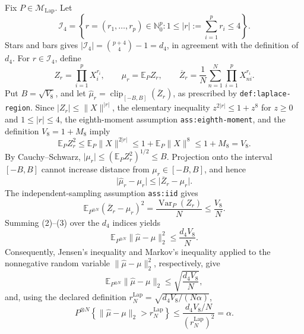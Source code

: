 Fix \(P\in\mathcal M_{\mathrm{Lap}}\).  Let
\[
 \mathcal I_4=\left\{r=(r_1,\ldots,r_p)\in\mathbb N_0^p:
 1\le |r|:=\sum_{i=1}^p r_i\le 4\right\}.
\]
Stars and bars gives
\(\lvert\mathcal I_4\rvert=\binom{p+4}{4}-1=d_4\), in agreement with
the definition of \(d_4\).  For \(r\in\mathcal I_4\), define
\[
 Z_r=\prod_{i=1}^p X_i^{r_i},\qquad
 \mu_r=\mathbb E_P Z_r,\qquad
 \overline Z_r=\frac1N\sum_{n=1}^N\prod_{i=1}^p X_{ni}^{r_i}.
\]
Put \(B=\sqrt{V_8}\), and let
\(\widehat\mu_r=\operatorname{clip}_{[-B,B]}(\overline Z_r)\), as
prescribed by \texttt{def:laplace-region}.  Since
\(\lvert Z_r\rvert\leq\lVert X\rVert^{|r|}\), the elementary inequality
\(z^{2|r|}\leq 1+z^8\) for \(z\geq0\) and \(1\leq |r|\leq4\), the
eighth-moment assumption \texttt{ass:eighth-moment}, and the definition
\(V_8=1+M_8\) imply
\[
 \mathbb E_P Z_r^2
 \leq \mathbb E_P\lVert X\rVert^{2|r|}
 \leq 1+\mathbb E_P\lVert X\rVert^8
 \leq 1+M_8=V_8.                                      \tag{1}
\]
By Cauchy--Schwarz, \(\lvert\mu_r\rvert\leq
(\mathbb E_PZ_r^2)^{1/2}\leq B\).  Projection onto the interval
\([-B,B]\) cannot increase distance from \(\mu_r\in[-B,B]\), and hence
\[
 \lvert\widehat\mu_r-\mu_r\rvert
 \leq\lvert\overline Z_r-\mu_r\rvert.                 \tag{2}
\]
The independent-sampling assumption \texttt{ass:iid} gives
\[
 \mathbb E_{P^{\otimes N}}(\overline Z_r-\mu_r)^2
 =\frac{\operatorname{Var}_P(Z_r)}{N}
 \leq\frac{V_8}{N}.                                    \tag{3}
\]
Summing (2)--(3) over the \(d_4\) indices yields
\[
 \mathbb E_{P^{\otimes N}}\lVert\widehat\mu-\mu\rVert_2^2
 \leq\frac{d_4V_8}{N}.                                 \tag{4}
\]
Consequently, Jensen's inequality and Markov's inequality applied to the
nonnegative random variable
\(\lVert\widehat\mu-\mu\rVert_2^2\), respectively, give
\[
 \mathbb E_{P^{\otimes N}}\lVert\widehat\mu-\mu\rVert_2
 \leq\sqrt{\frac{d_4V_8}{N}},                           \tag{5}
\]
and, using the declared definition
\(r_N^{\mathrm{Lap}}=\sqrt{d_4V_8/(N\alpha)}\),
\[
 P^{\otimes N}\!\left\{
 \lVert\widehat\mu-\mu\rVert_2>r_N^{\mathrm{Lap}}
 \right\}
 \leq
 \frac{d_4V_8/N}{(r_N^{\mathrm{Lap}})^2}
 =\alpha.                                               \tag{6}
\]

